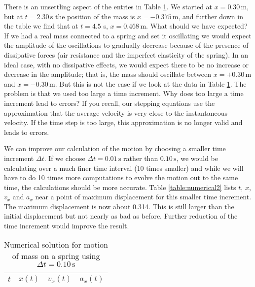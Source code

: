 There is an unsettling aspect of the entries in Table
\ref{table:numerical1}.  We started at $x = 0.30\, \mbox{m}$, but at
$t = 2.30\, \mbox{s}$ the position of the mass is $x = -0.375\,
\mbox{m}$, and further down in the table we find that at $t = 4.5$ s,
$x = 0.468\, \mbox{m}$.  What should we have expected?  If we had a
real mass connected to a spring and set it oscillating we would expect
the amplitude of the oscillations to gradually decrease because of the
presence of dissipative forces (air resistance and the imperfect
elasticity of the spring).  In an ideal case, with no dissipative
effects, we would expect there to be no increase or decrease in the
amplitude; that is, the mass should oscillate between $x = +0.30\,
\mbox{m}$ and $x = -0.30\, \mbox{m}$.  But this is not the case if we
look at the data in Table \ref{table:numerical1}.  The problem is that
we used too large a time increment.  Why does too large a time
increment lead to errors?  If you recall, our stepping equations use
the approximation that the average velocity is very close to the
instantaneous velocity.  If the time step is too large, this
approximation is no longer valid and leads to errors.
   
We can improve our calculation of the motion by choosing a smaller
time increment $\Delta t$.  If we choose $\Delta t = 0.01\, \mbox{s}$
rather than $0.10\, \mbox{s}$, we would be calculating over a much
finer time interval (10 times smaller) and while we will have to do 10
times more computations to evolve the motion out to the same time, the
calculations should be more accurate.  Table \ref{table:numerical2}
lists $t$, $x$, $v_x$ and $a_x$ near a point of maximum displacement for
this smaller time increment.  The maximum displacement is now about
0.314.  This is still larger than the initial displacement but not
nearly as bad as before.  Further reduction of the time increment
would improve the result.


\addtolength{\textheight}{.5in}
\addtolength{\footskip}{-2.in}
\mbox{}
\vspace{-2.in}

\twocolumn

\begin{table}[!t]
\caption{Numerical solution for motion of 
mass on a spring using $\Delta t=0.10\, \mbox{s}$}
\begin{small}
\begin{center}
\begin{tabular}{cccc}
$t$ & $x(t)$ & $v_x(t)$ & $a_x(t)$ \\
\hline

\hline
\end{tabular}
\end{center}
\end{small}
\label{table:numerical1}
\end{table}
\newpage

